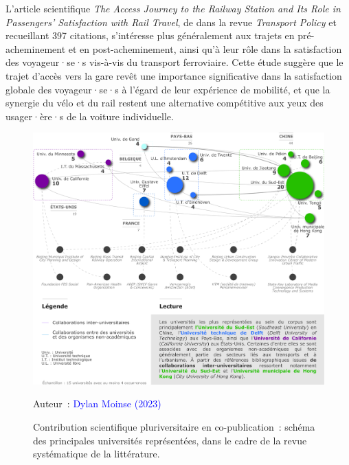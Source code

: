 \begin{refsegment}
\begin{customitemize}
\item L'article scientifique \textsl{The Access Journey to the Railway Station and Its Role in Passengers’ Satisfaction with Rail Travel}, de \textcolor{blue}{\textcite[359, 362, 363]{givoni_access_2007}} dans la revue \textsl{Transport Policy} et recueillant 397 citations, s'intéresse plus généralement aux trajets en pré-acheminement et en post-acheminement, ainsi qu'à leur rôle dans la satisfaction des voyageur·se·s vis-à-vis du transport ferroviaire. Cette étude suggère que le trajet d'accès vers la gare revêt une importance significative dans la satisfaction globale des voyageur·se·s à l'égard de leur expérience de mobilité, et que la synergie du vélo et du rail restent une alternative compétitive aux yeux des usager·ère·s de la voiture individuelle.
    \end{customitemize}%

    \begin{figure}[h!]\vspace*{4pt}
        \caption{Contribution scientifique pluriversitaire en co-publication~: schéma des principales universités représentées, dans le cadre de la revue systématique de la littérature.}
        \label{fig-chap2:copublications-universites-rsl}
        \centerline{\includegraphics[width=1\columnwidth]{src/Figures/Chap-2/FR_RSL_Collaborations_universites.pdf}}
        \vspace{5pt}
        \begin{flushright}\scriptsize{
        Auteur~: \textcolor{blue}{Dylan Moinse (2023)}
        }\end{flushright}
    \end{figure}


\end{refsegment}
